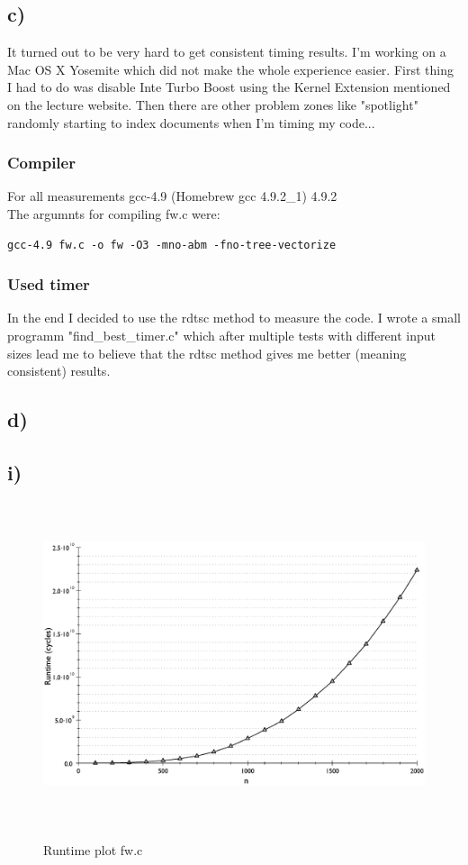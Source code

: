 \documentclass[10pt,a4paper,oneside,notitlepage]{report}
\begin{document}
\subsection*{c)}
It turned out to be very hard to get consistent timing results. I'm working on a Mac OS X Yosemite which did not make the whole experience easier. First thing I had to do was disable Inte Turbo Boost using the Kernel Extension mentioned on the lecture website. Then there are other problem zones like "spotlight" randomly starting to index  documents when I'm timing my code... 

\subsubsection*{Compiler}
For all measurements gcc-4.9 (Homebrew gcc 4.9.2\_1) 4.9.2 \\
The argumnts for compiling fw.c were:\\
\begin{verbatim}
gcc-4.9 fw.c -o fw -O3 -mno-abm -fno-tree-vectorize
\end{verbatim}

\subsubsection*{Used timer}
In the end I decided to use the rdtsc method to measure the code. I wrote a small programm "find\_best\_timer.c" which after multiple tests with different input sizes lead me to believe that the rdtsc method gives me better (meaning consistent) results.

\subsection*{d)}
\subsection*{i)}
\begin{figure}[H]
\caption{Runtime plot fw.c}
\includegraphics[height=9.5cm]{fw_runtime}
\label{fw_runtime}
\end{figure}
\end{document}
